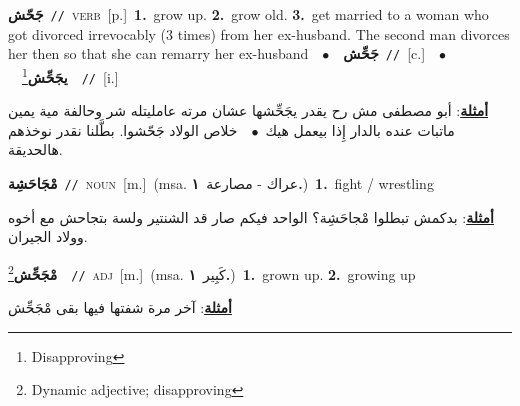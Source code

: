 \documentclass[10pt,a4paper,twoside]{article} %
\begin{document}
\begin{multicols}{2}
{\setlength\topsep{0pt}\textbf{\foreignlanguage{arabic}{جَحّش}}\ {\color{gray}\texttt{//}\color{black}}\ \textsc{verb}\ [p.]\ \textbf{1.}~grow up.  \textbf{2.}~grow old.  \textbf{3.}~get married to a woman who got divorced irrevocably (3 times) from her ex-husband. The second man divorces her then so that she can remarry her ex-husband\ \ $\bullet$\ \ \setlength\topsep{0pt}\textbf{\foreignlanguage{arabic}{جَحِّش}}\ {\color{gray}\texttt{//}\color{black}}\ [c.]\ \ $\bullet$\ \ \setlength\topsep{0pt}\textbf{\foreignlanguage{arabic}{يجَحِّش}}\footnote{Disapproving}\ \ {\color{gray}\texttt{//}\color{black}}\ [i.]\  \begin{flushright}\color{gray}\foreignlanguage{arabic}{\textbf{\underline{\foreignlanguage{arabic}{أمثلة}}}: أبو مصطفى مش رح يقدر يجَحِّشها عشان مرته عامليتله شر وحالفة مية يمين ماتبات عنده بالدار إِذا بيعمل هيك\ $\bullet$\ \  خلاص الولاد جَحّشوا. بطَّلنا نقدر نوخذهم هالحديقة.}\end{flushright}\color{black}} \vspace{2mm}

{\setlength\topsep{0pt}\textbf{\foreignlanguage{arabic}{مْجَاحَشِة}}\ {\color{gray}\texttt{//}\color{black}}\ \textsc{noun}\ [m.]\ \color{gray}(msa. \foreignlanguage{arabic}{عراك - مصارعة}~\foreignlanguage{arabic}{\textbf{١.}})\color{black}\ \textbf{1.}~fight / wrestling\  \begin{flushright}\color{gray}\foreignlanguage{arabic}{\textbf{\underline{\foreignlanguage{arabic}{أمثلة}}}: بدكمش تبطلوا مْجاحَشِة؟ الواحد فيكم صار قد الشنتير ولسة بتجاحش مع أخوه وولاد الجيران.}\end{flushright}\color{black}} \vspace{2mm}

{\setlength\topsep{0pt}\textbf{\foreignlanguage{arabic}{مْجَحِّش}}\footnote{Dynamic adjective; disapproving}\ \ {\color{gray}\texttt{//}\color{black}}\ \textsc{adj}\ [m.]\ \color{gray}(msa. \foreignlanguage{arabic}{كَبِير}~\foreignlanguage{arabic}{\textbf{١.}})\color{black}\ \textbf{1.}~grown up.  \textbf{2.}~growing up\  \begin{flushright}\color{gray}\foreignlanguage{arabic}{\textbf{\underline{\foreignlanguage{arabic}{أمثلة}}}: آخر مرة شفتها فيها بقى مْجَحِّش}\end{flushright}\color{black}} \vspace{2mm}


\end{multicols}
\end{document}
